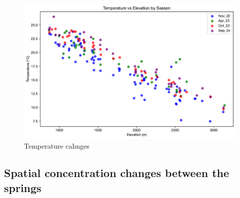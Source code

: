 \FloatBarrier

\begin{figure}[h]
    \centering
    \includegraphics[width=\textwidth]{Temperature_Elevation_Season.pdf}
    \caption{Temperature cahnges}
    \label{fig:seasonal_change2}
\end{figure}

\FloatBarrier



\subsection{Spatial concentration changes between the springs}

